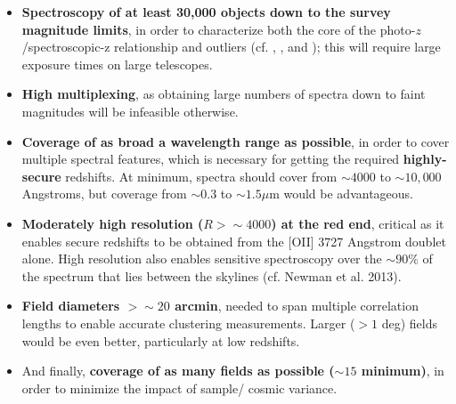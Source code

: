 \begin{itemize}
\item {\bf Spectroscopy of at least 30,000 objects down to the survey magnitude limits}, in order to characterize both the core of the photo-$z$/spectroscopic-z relationship and outliers (cf. \citealt{MaHuterer}, \citealt{BernsteinHuterer}, and \citealt{Hearin10}); this will require large exposure times on large telescopes.
\item {\bf High multiplexing}, as obtaining large numbers of spectra down to faint magnitudes will be infeasible otherwise.
\item {\bf Coverage of as broad a wavelength range as possible}, in order to cover multiple spectral features, which is necessary for getting the required {\bf highly-secure} redshifts.  At minimum, spectra should cover from $\sim 4000$ to $\sim 10,000$ Angstroms, but coverage from $\sim 0.3$ to $\sim 1.5\mu$m would be advantageous.
\item {\bf Moderately high resolution ($R>\sim 4000$) at the red end}, critical as it enables secure redshifts to be obtained from the [OII] 3727 Angstrom doublet alone.  High resolution also enables sensitive spectroscopy over the $\sim 90\%$ of the spectrum that lies between the skylines (cf. Newman et al. 2013).
\item {\bf Field diameters $>\sim20$ arcmin}, needed to span multiple correlation lengths to enable accurate clustering measurements.
Larger ($>1$ deg) fields would be even better, particularly at low redshifts.
\item And finally, {\bf coverage of as many fields as possible ($\sim 15$ minimum)}, in order to minimize the impact of sample/ cosmic variance.
\end{itemize}


